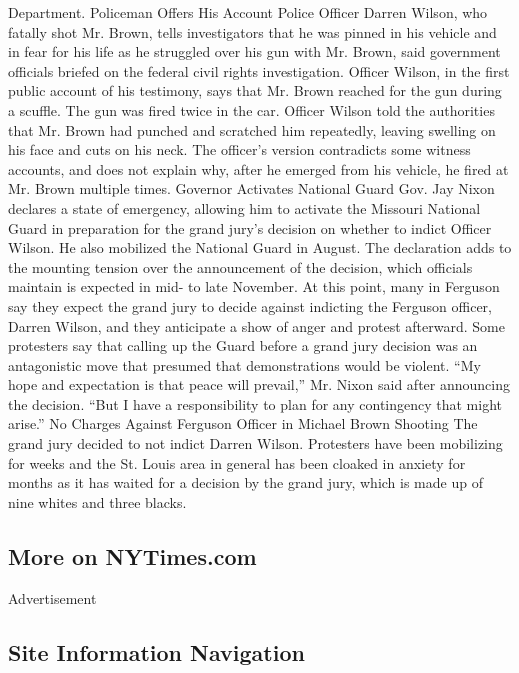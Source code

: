 Department. Policeman Offers His Account Police Officer Darren Wilson,
who fatally shot Mr. Brown, tells investigators that he was pinned in
his vehicle and in fear for his life as he struggled over his gun with
Mr. Brown, said government officials briefed on the federal civil rights
investigation. Officer Wilson, in the first public account of his
testimony, says that Mr. Brown reached for the gun during a scuffle. The
gun was fired twice in the car. Officer Wilson told the authorities that
Mr. Brown had punched and scratched him repeatedly, leaving swelling on
his face and cuts on his neck. The officer's version contradicts some
witness accounts, and does not explain why, after he emerged from his
vehicle, he fired at Mr. Brown multiple times. Governor Activates
National Guard Gov. Jay Nixon declares a state of emergency, allowing
him to activate the Missouri National Guard in preparation for the grand
jury's decision on whether to indict Officer Wilson. He also mobilized
the National Guard in August. The declaration adds to the mounting
tension over the announcement of the decision, which officials maintain
is expected in mid- to late November. At this point, many in Ferguson
say they expect the grand jury to decide against indicting the Ferguson
officer, Darren Wilson, and they anticipate a show of anger and protest
afterward. Some protesters say that calling up the Guard before a grand
jury decision was an antagonistic move that presumed that demonstrations
would be violent. ``My hope and expectation is that peace will
prevail,'' Mr. Nixon said after announcing the decision. ``But I have a
responsibility to plan for any contingency that might arise.'' No
Charges Against Ferguson Officer in Michael Brown Shooting The grand
jury decided to not indict Darren Wilson. Protesters have been
mobilizing for weeks and the St. Louis area in general has been cloaked
in anxiety for months as it has waited for a decision by the grand jury,
which is made up of nine whites and three blacks.

\hypertarget{more-on-nytimescom}{%
\subsection{More on NYTimes.com}\label{more-on-nytimescom}}

Advertisement

\hypertarget{site-information-navigation}{%
\subsection{Site Information
Navigation}\label{site-information-navigation}}

